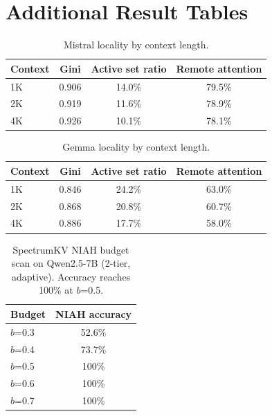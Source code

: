 \documentclass[11pt]{article}
\newcommand{\pct}{\%}
\theoremstyle{definition}
\theoremstyle{plain}
\begin{document}
\appendix

\section{Additional Result Tables}
\label{app:tables}

\begin{table}[h]
\centering
\caption{Mistral locality by context length.}
\small
\begin{tabular}{lccc}
\toprule
Context & Gini & Active set ratio & Remote attention \\
\midrule
1K & 0.906 & 14.0\pct{} & 79.5\pct{} \\
2K & 0.919 & 11.6\pct{} & 78.9\pct{} \\
4K & 0.926 & 10.1\pct{} & 78.1\pct{} \\
\bottomrule
\end{tabular}
\end{table}

\begin{table}[h]
\centering
\caption{Gemma locality by context length.}
\small
\begin{tabular}{lccc}
\toprule
Context & Gini & Active set ratio & Remote attention \\
\midrule
1K & 0.846 & 24.2\pct{} & 63.0\pct{} \\
2K & 0.868 & 20.8\pct{} & 60.7\pct{} \\
4K & 0.886 & 17.7\pct{} & 58.0\pct{} \\
\bottomrule
\end{tabular}
\end{table}

\begin{table}[h]
\centering
\caption{SpectrumKV NIAH budget scan on Qwen2.5-7B (2-tier, adaptive).  Accuracy reaches 100\pct{} at $b$=0.5.}
\small
\begin{tabular}{lc}
\toprule
Budget & NIAH accuracy \\
\midrule
$b$=0.3 & 52.6\pct{} \\
$b$=0.4 & 73.7\pct{} \\
$b$=0.5 & 100\pct{} \\
$b$=0.6 & 100\pct{} \\
$b$=0.7 & 100\pct{} \\
\bottomrule
\end{tabular}
\end{table}
\end{document}
